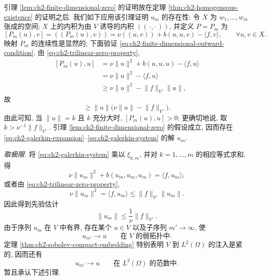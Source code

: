 \begin{Proof}
引理 \ref{lem:ch2-finite-dimensional-zero} 的证明放在定理 \ref{thm:ch2-homogeneous-existence} 的证明之后. 我们如下应用该引理证明 $u_m$ 的存在性: 令 $X$ 为 $w_1,\ldots,w_m$ 张成的空间; $X$ 上的内积为由 $V$ 诱导的内积 $((\,\cdot,\cdot\,))$, 并定义 $P=P_m$ 为
\[
[P_m(u),v]=((P_m(u),v))
=\nu((u,v))+b(u,u,v)-\langle f,v\rangle,
\qquad\forall u,v\in X.
\]
映射 $P_m$ 的连续性是显然的; 下面验证 \eqref{eq:ch2-finite-dimensional-outward-condition}. 由 \eqref{eq:ch2-trilinear-zero-property},
\[
\begin{aligned}
[P_m(u),u]
&=\nu\lVert u\rVert^2+b(u,u,u)-\langle f,u\rangle\\
&=\nu\lVert u\rVert^2-\langle f,u\rangle\\
&\geq\nu\lVert u\rVert^2-\lVert f\rVert_{V'}\lVert u\rVert,
\end{aligned}
\]
故
\begin{equation}
[P_m(u),u]\geq\lVert u\rVert
\bigl(\nu\lVert u\rVert-\lVert f\rVert_{V'}\bigr).
\label{eq:ch2-galerkin-outward-estimate}
\end{equation}
由此可知, 当 $\lVert u\rVert=k$ 且 $k$ 充分大时, $[P_m(u),u]>0$; 更确切地说, 取 $k>\nu^{-1}\lVert f\rVert_{V'}$. 引理 \ref{lem:ch2-finite-dimensional-zero} 的假设成立, 因而存在 \eqref{eq:ch2-galerkin-expansion}--\eqref{eq:ch2-galerkin-system} 的解 $u_m$.

\emph{取极限.} 将 \eqref{eq:ch2-galerkin-system} 乘以 $\xi_{k,m}$, 并对 $k=1,\ldots,m$ 的相应等式求和, 得
\[
\nu\lVert u_m\rVert^2+b(u_m,u_m,u_m)=\langle f,u_m\rangle;
\]
或者由 \eqref{eq:ch2-trilinear-zero-property},
\[
\nu\lVert u_m\rVert^2=\langle f,u_m\rangle
\leq\lVert f\rVert_{V'}\lVert u_m\rVert.
\]
\hypertarget{chapter-02-page-126}{}
因此得到先验估计
\begin{equation}
\lVert u_m\rVert\leq\frac1\nu\lVert f\rVert_{V'}.
\label{eq:ch2-galerkin-apriori-estimate}
\end{equation}
由于序列 $u_m$ 在 $V$ 中有界, 存在某个 $u\in V$ 以及子序列 $m'\to\infty$, 使
\begin{equation}
u_{m'}\longrightarrow u
\qquad\text{在 }V\text{ 的弱拓扑中}.
\label{eq:ch2-galerkin-weak-convergence}
\end{equation}
定理 \ref{thm:ch2-sobolev-compact-embedding} 特别表明 $V$ 到 $L^2(\Omega)$ 的注入是紧的, 因而还有
\begin{equation}
u_{m'}\longrightarrow u
\qquad\text{在 }L^2(\Omega)\text{ 的范数中}.
\label{eq:ch2-galerkin-strong-l2-convergence}
\end{equation}
暂且承认下述引理.


\end{Proof}

